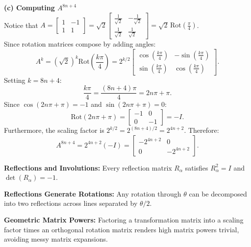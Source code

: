 \begin{solution}
\medskip
\textbf{(c) Computing $A^{8n+4}$} \\
Notice that $A = \begin{bmatrix} 1 & -1 \\ 1 & 1 \end{bmatrix} = \sqrt{2} \begin{bmatrix} \frac{1}{\sqrt{2}} & -\frac{1}{\sqrt{2}} \\ \frac{1}{\sqrt{2}} & \frac{1}{\sqrt{2}} \end{bmatrix} = \sqrt{2}\,\text{Rot}\left(\frac{\pi}{4}\right)$. \\
Since rotation matrices compose by adding angles:
\[
A^k = (\sqrt{2})^k \text{Rot}\left(\frac{k\pi}{4}\right) = 2^{k/2} \begin{bmatrix} \cos\left(\frac{k\pi}{4}\right) & -\sin\left(\frac{k\pi}{4}\right) \\ \sin\left(\frac{k\pi}{4}\right) & \cos\left(\frac{k\pi}{4}\right) \end{bmatrix}.
\]
Setting $k = 8n + 4$:
\[
\frac{k\pi}{4} = \frac{(8n + 4)\pi}{4} = 2n\pi + \pi.
\]
Since $\cos(2n\pi + \pi) = -1$ and $\sin(2n\pi + \pi) = 0$:
\[
\text{Rot}(2n\pi + \pi) = \begin{bmatrix} -1 & 0 \\ 0 & -1 \end{bmatrix} = -I.
\]
Furthermore, the scaling factor is $2^{k/2} = 2^{(8n+4)/2} = 2^{4n+2}$. Therefore:
\[
A^{8n+4} = 2^{4n+2} (-I) = \begin{bmatrix} -2^{4n+2} & 0 \\ 0 & -2^{4n+2} \end{bmatrix}.
\]
\end{solution}

\begin{takeaways}
\item \textbf{Reflections and Involutions:} Every reflection matrix $R_\alpha$ satisfies $R_\alpha^2 = I$ and $\det(R_\alpha) = -1$.
\item \textbf{Reflections Generate Rotations:} Any rotation through $\theta$ can be decomposed into two reflections across lines separated by $\theta/2$.
\item \textbf{Geometric Matrix Powers:} Factoring a transformation matrix into a scaling factor times an orthogonal rotation matrix renders high matrix powers trivial, avoiding messy matrix expansions.
\end{takeaways}
